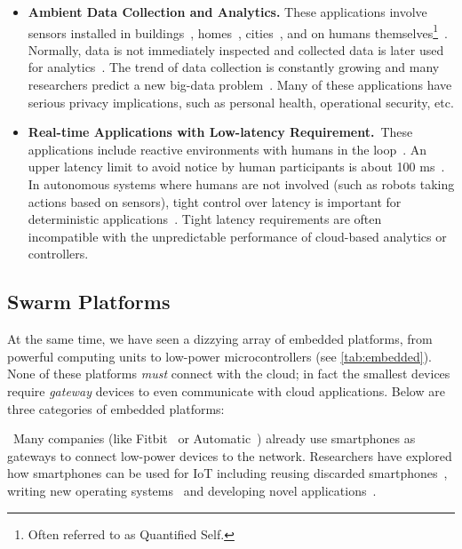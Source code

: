 \begin{itemize}[topsep=5pt]

\item \textbf{Ambient Data Collection and Analytics.} These applications involve
  sensors installed in buildings~\cite{dawson2010smap},
  homes~\cite{hnat2011hitchhiker}, cities~\cite{sfpark}, and on humans
  themselves\footnote{Often referred to as Quantified Self.}~\cite{fitbit,
    swan2013quantified}.  Normally, data is not immediately inspected and
  collected data is later used for analytics~\cite{kolter2011redd}.  The trend
  of data collection is constantly growing and many researchers predict a new
  big-data problem~\cite{diaz2012big, zaslavsky2013sensing}.  Many of these
  applications have serious privacy implications, such as personal health,
  operational security, etc.

\item \textbf{Real-time Applications with Low-latency Requirement.}~These
  applications include reactive environments with humans in the
  loop~\cite{cooperstock1997reactive}.
An upper latency limit to avoid notice by human participants is about 100
ms~\cite{nielsen1994usability}.  In autonomous systems where humans are not
involved (such as robots taking actions based on sensors), tight control over
latency is important for deterministic
applications~\cite{eidson2012distributed}.  Tight latency requirements are often
incompatible with the unpredictable performance of cloud-based analytics or
controllers.

\end{itemize}

\subsection{Swarm Platforms}
\label{sec:swarm-platforms}

At the same time, we have seen a dizzying array of embedded platforms, from
powerful computing units to low-power microcontrollers (see
\autoref{tab:embedded}). None of these platforms \emph{must} connect with the
cloud; in fact the smallest devices require \emph{gateway} devices to even
communicate with cloud applications. Below are three categories of embedded
platforms:

~Many companies (like Fitbit~\cite{fitbit} or
Automatic~\cite{automatic}) already use smartphones as gateways to connect
low-power devices to the network.  Researchers have explored how smartphones can
be used for IoT including reusing discarded smartphones~\cite{challen2014mote},
writing new operating systems~\cite{janos} and developing novel
applications~\cite{hong2014smartphone}.

